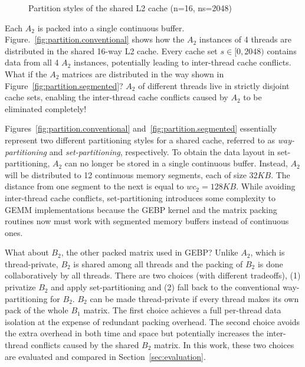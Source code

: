 \begin{figure}
  \centering
  \caption{Partition styles of the shared L2 cache (n=16, ns=2048)}
  \label{fig:partition}
\end{figure}

Each $A_2$ is packed into a single continuous buffer.
Figure.~\ref{fig:partition.conventional} shows how the
$A_2$ instances of 4 threads are distributed in the shared 16-way L2 cache.
Every cache set $s \in [0,2048)$ contains
data from all 4 $A_2$ instances,
potentially leading to inter-thread cache conflicts.
What if the $A_2$ matrices are distributed in the way shown in
Figure~\ref{fig:partition.segmented}?
$A_2$ of different threads live in strictly disjoint cache sets, enabling
the inter-thread cache conflicts caused by $A_2$ to be
eliminated completely!

Figures~\ref{fig:partition.conventional} and~\ref{fig:partition.segmented}
essentially represent two different partitioning styles for a shared cache,
referred to as \emph{way-partitioning} and \emph{set-partitioning}, respectively.
To obtain the data layout in set-partitioning,
$A_2$ can no longer be stored in a single continuous buffer.
Instead, $A_2$ will be distributed to 12 continuous memory segments, each of size $32KB$.
The distance from one segment to the next is equal to $wc_2=128KB$.
While avoiding inter-thread cache conflicts,
set-partitioning
introduces some complexity to GEMM implementations
because the GEBP kernel and the matrix packing routines
now must work with segmented memory buffers instead of continuous ones.

What about $B_2$, the other packed matrix used in GEBP?
Unlike $A_2$, which is thread-private,
$B_2$ is shared among all threads and
the packing of $B_2$ is done collaboratively by all threads.
There are two choices (with different tradeoffs), (1) privatize $B_2$ and apply 
set-partitioning and (2) 
fall back to the conventional way-partitioning for $B_2$.
$B_2$ can be made thread-private if every thread makes
its own pack of the whole $B_1$ matrix.
The first choice achieves a full per-thread data isolation
at the expense of redundant packing overhead.
The second choice avoids the extra overhead in both time and space
but potentially increases the inter-thread conflicts caused
by the shared $B_2$ matrix.
In this work, these two choices are evaluated
and compared in Section~\ref{sec:evaluation}.


